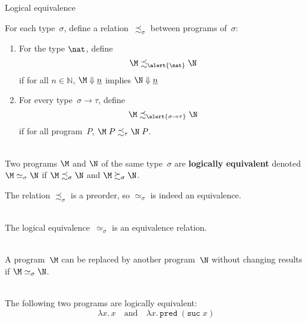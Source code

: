 \begin{frame}{Logical equivalence}
  \begin{definition}
    For each type~$\sigma$, define a relation~$\precsim_\sigma$ between
    programs of~$\sigma$:
    \begin{enumerate}
      \item For the type $\nat$, define
        \[
          \M \precsim_{\alert{\nat}} \N
        \]
        if for all $n \in \mathbb{N}$, 
          $\M \Downarrow \underline{n}$ implies $\N \Downarrow \underline{n}$
      \item For every type~$\sigma \to \tau$, define
        \[
          \M \precsim_{\alert{\sigma \to\tau}} \N
        \]
          if for all program~$P$,
            $\M\;P \precsim_{\tau} \N\;P$.
    \end{enumerate}
  \end{definition}
  ~\\

    Two programs $\M$ and $\N$ of the same type~$\sigma$ are \textbf{logically
      equivalent} denoted~$\M\simeq_\sigma\N$ if $\M \precsim_\sigma \N$ and
    $\M \succsim_\sigma \N$. 

\end{frame}

\begin{frame}
  The relation $\precsim_\sigma$ is a preorder, so
  $\simeq_\sigma$ is indeed an equivalence.
  \\~\\

  \begin{proposition}
    The logical equivalence~$\simeq_\sigma$ is an equivalence relation.
  \end{proposition}
  ~\\

  A program~$\M$ can be replaced by another program~$\N$ without changing
  results if $\M \simeq_\sigma \N$.
  \\~\\
    \begin{example}
      The following two programs are logically equivalent:
      \[
        \lambda x.\, x
        \quad\text{and}\quad
        \lambda x.\, \mathtt{pred}\; (\mathtt{suc}\; x)
      \]
    \end{example}
\end{frame}

